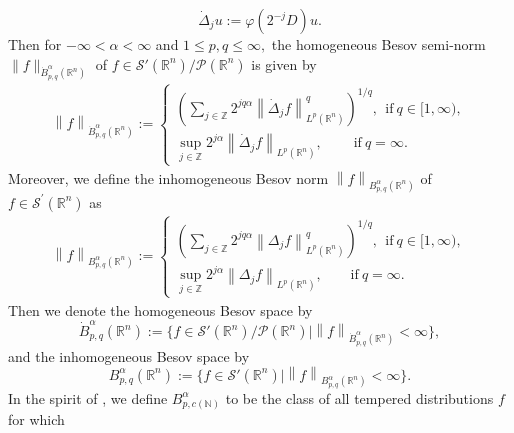 \documentclass[11pt]{article}
\theoremstyle{plain}\newtheorem{definition}{Definition}[section]
\theoremstyle{definition}\newtheorem{theorem}{Theorem}[section]
\theoremstyle{plain}\newtheorem{lemma}[theorem]{Lemma}
\theoremstyle{plain}\newtheorem{coro}[theorem]{Corollary}
\theoremstyle{plain}\newtheorem{prop}[theorem]{Proposition}
\theoremstyle{remark}\newtheorem{remark}{Remark}[section]
\newcommand{\norm}[1]{\left\|#1\right\|}
\newcommand{\B}{\Big}
\numberwithin{equation}{section}
\begin{document}
\begin{equation*}
  \dot{\Delta}_{j}u:= \varphi(2^{-j}D)u.
\end{equation*}
Then for $-\infty <\alpha<\infty$ and $1\leq p,q\leq \infty,$ the homogeneous Besov semi-norm $ \|f\|_{\dot{B}^{\alpha}_{p, q}(\mathbb{R}^{n})}$ of $f\in \mathcal{S}'(\mathbb{R}^{n})/\mathcal{P}(\mathbb{R}^{n})$ is given by
\begin{equation*}
	\begin{aligned}
  \norm{f}_{\dot{B}^{\alpha}_{p, q}(\mathbb{R}^{n})}:=\left\{\begin{array}{lll}\left(\sum_{j\in \mathbb{Z}}2^{jq\alpha}\norm{\dot{\Delta}_{j} f} _{L^p(\mathbb{R}^{n})}^q\right)^{1/q},~~\text{if}\ q\in [1,\infty),\\
  	\sup_{j\in \mathbb{Z}}2^{j\alpha}\norm {\dot{\Delta}_{j}f} _{L^p(\mathbb{R}^{n})},~~~~~~~~~~\text{if}~q=\infty.\end{array}\right.
\end{aligned}\end{equation*}
Moreover, we define the inhomogeneous Besov norm $\norm{f}_{B^\alpha_{p,q}(\mathbb{R}^{n})}$ of $f\in \mathcal{S}^{'}(\mathbb{R}^{n})$ as
\begin{equation*}
	\begin{aligned}
  \norm{f}_{B^{\alpha}_{p, q}(\mathbb{R}^{n})}:=\left\{\begin{array}{lll}\left(\sum_{j\in \mathbb{Z}}2^{jq\alpha}\norm{\Delta_{j} f} _{L^p(\mathbb{R}^{n})}^q\right)^{1/q},~~\text{if}\ q\in [1,\infty),\\
  	\sup_{j\in \mathbb{Z}}2^{j\alpha}\norm {\Delta_{j}f} _{L^p(\mathbb{R}^{n})},~~~~~~~~~\text{if}~q=\infty.\end{array}\right.
\end{aligned}\end{equation*}
Then we denote the homogeneous Besov space by
\begin{equation*}
  \dot{B}^{\alpha}_{p,q}(\mathbb{R}^{n}):=\Big\{f\in\mathcal{S}'(\mathbb{R}^{n})/\mathcal{P}(\mathbb{R}^{n})\B|
  \norm{f}_{\dot{B}^{\alpha}_{p,q}(\mathbb{R}^{n})}<\infty  \Big\},
\end{equation*} and the inhomogeneous Besov space by
\begin{equation*}
  B^{\alpha}_{p,q}(\mathbb{R}^{n}):=\Big\{f\in\mathcal{S}'(\mathbb{R}^{n})\B|\norm{f}_{B^{\alpha}_{p,q}(\mathbb{R}^{n})}<\infty  \Big\}.
\end{equation*}
In the spirit of  \cite{[CCFS]}, we define $ {B}^\alpha _{p,c(\mathbb{N})}$ to be the class of all tempered distributions $f$ for which
\end{document}
